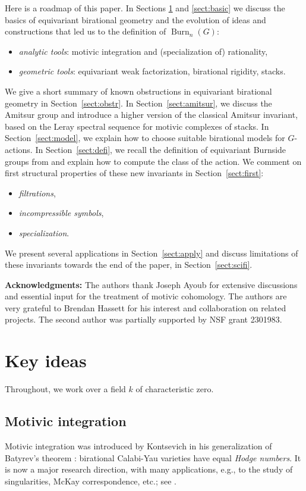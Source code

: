 \documentclass[12pt,reqno]{amsart}
\theoremstyle{plain}
\theoremstyle{remark}
\theoremstyle{definition}
\numberwithin{equation}{section}
\DeclareMathOperator{\Burn}{Burn}
\begin{document}
Here is a roadmap of this paper.
In Sections \ref{sec.key} and \ref{sect:basic} we discuss the basics of equivariant birational geometry and the evolution of ideas and constructions that led us to the definition of $\Burn_n(G)$:
\begin{itemize}
\item {\em analytic tools}: motivic integration and (specialization of) rationality,
\item {\em geometric tools}: equivariant weak factorization, birational rigidity, stacks. 
\end{itemize}
We give a short summary of known obstructions in equivariant birational geometry in  Section~\ref{sect:obstr}. In Section~\ref{sect:amitsur}, we discuss the Amitsur group and introduce a higher version of the classical Amitsur invariant, based on the Leray spectral sequence for  motivic complexes of stacks.
In Section~\ref{sect:model}, we explain how to choose 
suitable birational models for $G$-actions. In Section~\ref{sect:defi}, we recall the definition of equivariant Burnside groups from \cite{BnG} and explain how to compute the class of the action. 
We comment on first structural properties of these new invariants in Section~\ref{sect:first}: 
\begin{itemize}
\item {\em filtrations},
\item {\em incompressible symbols},
\item {\em specialization}.
\end{itemize}
We present several applications in Section~\ref{sect:apply} and discuss limitations of these invariants towards the end of the paper, in Section~\ref{sect:scifi}.




\bigskip

\noindent
\textbf{Acknowledgments:}
The authors thank Joseph Ayoub for extensive discussions and essential input for the treatment of motivic cohomology.
The authors are very grateful to Brendan Hassett for his interest and collaboration on related projects. The second author was partially supported by NSF grant 2301983.



\section{Key ideas}
\label{sec.key}
Throughout, we work over a field $k$ of characteristic zero. 

\subsection*{Motivic integration}
Motivic integration was introduced by Kontsevich in his generalization of Batyrev's theorem 
\cite{batyrev}: birational Calabi-Yau varieties have equal {\em Hodge numbers}. 
It is now a major research direction, with many applications, e.g., to the study of singularities, McKay correspondence, etc.; see \cite{CLNS}. 
\end{document}

